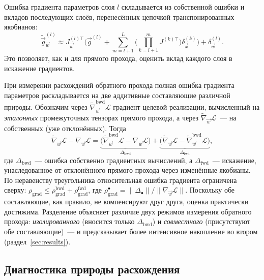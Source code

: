 Ошибка градиента параметров слоя $l$ складывается из собственной ошибки и
вкладов последующих слоёв, перенесённых цепочкой транспонированных якобианов:
\begin{equation}
    \label{eq:bwd}
    \tilde{\Vec{g}}_{\Vec{w}}^{(l)} \approx
    J^{(l)\top}_{\Vec{w}}\Biggl(\Vec{g}^{(l)}
    + \sum_{m=l+1}^{L}\Biggl(\prod_{k=l+1}^{m} J^{(k)\top}\Biggr)\delta^{(k)}_{\Vec{x}}\Biggr)
    + \delta^{(l)}_{\Vec{w}}.
\end{equation}
Это позволяет, как и для прямого прохода, оценить вклад каждого слоя в искажение
градиентов.

При измерении расхождений обратного прохода полная ошибка градиента параметров
раскладывается на две аддитивные составляющие различной природы. Обозначим через
$\tilde{\nabla}^{\text{bwd}}_{\Vec{w}}\mathcal{L}$ градиент целевой реализации,
вычисленный на \emph{эталонных} промежуточных тензорах прямого прохода, а через
$\tilde{\nabla}_{\Vec{w}}\mathcal{L}$~--- на собственных (уже отклонённых). Тогда
\begin{equation}
    \label{eq:grad-decomp}
    \tilde{\nabla}_{\Vec{w}}\mathcal{L} - \nabla_{\Vec{w}}\mathcal{L}
    = \underbrace{\bigl(\tilde{\nabla}^{\text{bwd}}_{\Vec{w}}\mathcal{L}
        - \nabla_{\Vec{w}}\mathcal{L}\bigr)}_{\Delta_{\text{bwd}}}
    + \underbrace{\bigl(\tilde{\nabla}_{\Vec{w}}\mathcal{L}
        - \tilde{\nabla}^{\text{bwd}}_{\Vec{w}}\mathcal{L}\bigr)}_{\Delta_{\text{fwd}}},
\end{equation}
где $\Delta_{\text{bwd}}$~--- ошибка собственно градиентных вычислений, а
$\Delta_{\text{fwd}}$~--- искажение, унаследованное от отклонённого прямого прохода
через изменённые якобианы. По неравенству треугольника относительная ошибка
градиента ограничена сверху:
$\rho_{\text{grad}}\le\rho_{\text{grad}}^{\text{bwd}}+\rho_{\text{grad}}^{\text{fwd}}$,
где $\rho_{\text{grad}}^{\bullet}=\|\Delta_{\bullet}\|/\|\nabla_{\Vec{w}}\mathcal{L}\|$.
Поскольку обе составляющие, как правило, не компенсируют друг друга, оценка
практически достижима. Разделение объясняет различие двух режимов измерения
обратного прохода: \emph{изолированного} (вносится только $\Delta_{\text{bwd}}$) и
\emph{совместного} (присутствуют обе составляющие)~--- и предсказывает более
интенсивное накопление во втором (раздел~\ref{sec:results}).

\subsection{Диагностика природы расхождения}

